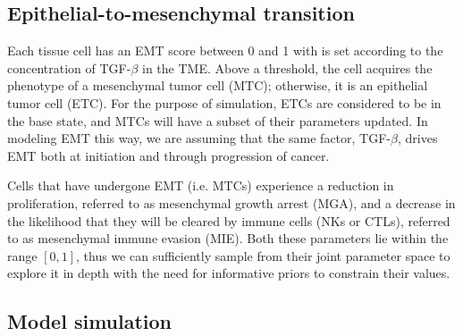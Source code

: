 \documentclass[11pt]{article}
\begin{document}
\subsection{Epithelial-to-mesenchymal transition}\label{EMT}
Each tissue cell has an EMT score between 0 and 1 with is set according to the concentration of TGF-$\beta$ in the TME. Above a threshold, the cell acquires the phenotype of a mesenchymal tumor cell (MTC); otherwise, it is an epithelial tumor cell (ETC).
For the purpose of simulation, ETCs are considered to be in the base state, and MTCs will have a subset of their parameters updated.
In modeling EMT this way, we are assuming that the same factor, TGF-$\beta$, drives EMT both at initiation and through progression of cancer.

\par
Cells that have undergone EMT (i.e. MTCs) experience a reduction in proliferation, referred to as mesenchymal growth arrest (MGA), and a decrease in the likelihood that they will be cleared by immune cells (NKs or CTLs), referred to as mesenchymal immune evasion (MIE). Both these parameters lie within the range $[0,1]$, thus we can sufficiently sample from their joint parameter space to explore it in depth with the need for informative priors to constrain their values.

\subsection{Model simulation}
\end{document}
